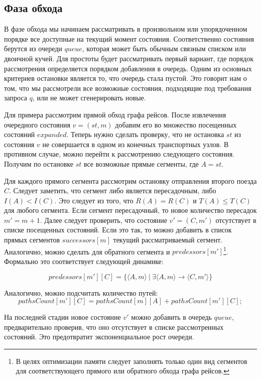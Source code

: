 \FloatBarrier
\subsection{Фаза обхода}
В фазе обхода мы начинаем рассматривать в произвольном или упорядоченном порядке все доступные на текущий момент состояния. Соответственно состояния берутся из очереди $queue$, которая может быть обычным связным списком или двоичной кучей. Для простоты будет рассматривать первый вариант, где порядок рассмотрения определяется порядком добавления в очередь. Одним из основных критериев остановки является то, что очередь стала пустой. Это говорит нам о том, что мы рассмотрели все возможные состояния, подходящие под требования запроса $q$, или не может сгенерировать новые.

Для примера рассмотрим прямой обход графа рейсов. После извлечения очередного состояния $v=(st, m)$ добавим его во множество посещенных состояний $expanded$. Теперь нужно сделать проверку, что не остановка $st$ из состояния $v$ не совершается в одном из конечных транспортных узлов. В противном случае, можно перейти к рассмотрению следующего состояния. Получим по остановке $st$ все возможные прямые сегменты, где $A = st$. 

Для каждого прямого сегмента рассмотрим остановку отправления второго поезда $C$. Следует заметить, что сегмент либо является пересадочным, либо $I(A) < I(C)$. Это следует из того, что $R(A)=R(C)$ и $T(A) \leqslant T(C)$ для любого сегмента. Если сегмент пересадочный, то новое количество пересадок $m' = m + 1$. Далее следует проверить, что состояние $v'=(C, m')$ отсутствует в списке посещенных состояний. Если это так, то можно добавить в список прямых сегментов $successors[m]$ текущий рассматриваемый сегмент. Аналогично, можно сделать для обратного сегмента и $predessors[m']$\footnote{В целях оптимизации памяти следует заполнять только один вид сегментов для соответствующего прямого или обратного обхода графа рейсов.}. Формально это соответствует следующей динамике:

\[
predessors[m'][C]=\{\langle A, m\rangle\ |\ \exists \langle A, m \rangle \rightarrow \langle C, m' \rangle\}
\]

Аналогично, можно подсчитать количество путей:
\[
pathsCount[m'][C] = pathsCount[m][A] + pathsCount[m'][C];
\]

На последней стадии новое состояние $v'$ можно добавить в очередь $queue$, предварительно проверив, что оно отсутствует в списке рассмотренных состояний. Это предотвратит экспоненциальное рост очереди.


